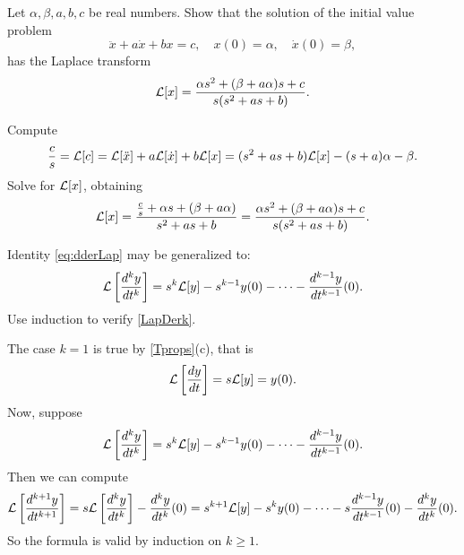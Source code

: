 \documentclass{ximera}
\begin{document}
\begin{exercise} \label{c13.4.4}
Let $\alpha,\beta,a,b,c$ be real numbers.  Show that the solution
of the initial value problem
\[
\ddot x +a\dot x +b x=c,\quad x(0)=\alpha,\quad \dot x(0)=\beta,
\]
has the Laplace transform
\[
{\cal L}[x] = \frac{\alpha s^2 +(\beta +a\alpha)s+c}{s(s^2+as+b)}.
\]

\begin{solution}
Compute
\[
\frac{c}{s} = {\cal L}[c]
= {\cal L}[\ddot{x}] + a{\cal L}[\dot{x}] + b{\cal L}[x]
= (s^2 + as + b){\cal L}[x] - (s + a)\alpha - \beta.
\]
Solve for ${\cal L}[x]$, obtaining
\[
{\cal L}[x]
= \frac{\frac{c}{s} + \alpha s + (\beta + a\alpha)}{s^2 + as + b}
= \frac{\alpha s^2 + (\beta + a\alpha)s + c}{s(s^2 + as + b)}.
\]


\end{solution}
\end{exercise}

\begin{exercise}   \label{exer:kderLap}
Identity \eqref{eq:dderLap} may be 
generalized to: 
\begin{equation}  \label{LapDerk}
{\cal L}\left[\frac{d^k y}{dt^k}\right] =
s^k{\cal L}[y] - s^{k-1} y(0) - \cdots - \frac{d^{k-1} y}{dt^{k-1}}(0).
\end{equation}
Use induction to verify \eqref{LapDerk}. 

\begin{solution}
The case $k = 1$ is true by \eqref{Tprops}(c), that is
\[
{\cal L}\left[\frac{dy}{dt}\right] = s{\cal L}[y] = y(0).
\]
Now, suppose
\[
{\cal L}\left[\frac{d^ky}{dt^k}\right] = s^k{\cal L}[y] - s^{k - 1}y(0)
- \cdots - \frac{d^{k - 1}y}{dt^{k - 1}}(0).
\]
Then we can compute
\[
{\cal L}\left[\frac{d^{k + 1}y}{dt^{k + 1}}\right] =
s{\cal L}\left[\frac{d^ky}{dt^k}\right] - \frac{d^ky}{dt^k}(0)
= s^{k + 1}{\cal L}[y] - s^{k}y(0)
- \cdots - s\frac{d^{k - 1}y}{dt^{k - 1}}(0) - \frac{d^ky}{dt^k}(0).
\]
So the formula is valid by induction on $k \geq 1$.





\end{solution}
\end{exercise}
\end{document}
